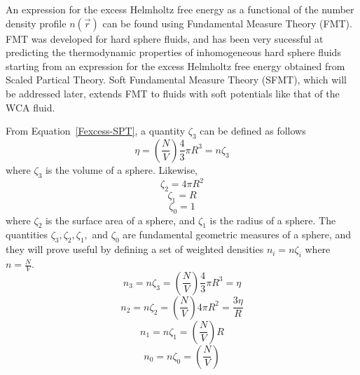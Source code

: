 \documentclass[12pt]{article}
\begin{document}
An expression for the excess Helmholtz free energy as a functional of the number density profile $n(\vec r)$ can be found using Fundamental Measure Theory (FMT).
FMT was developed for hard sphere fluids, and has been very sucessful at predicting the thermodynamic properties of inhomogeneous hard sphere fluids starting from an expression for the excess Helmholtz free energy obtained from Scaled Partical Theory. 
Soft Fundamental Measure Theory (SFMT), which will be addressed later, extends FMT to fluids with soft potentials like that of the WCA fluid.

From Equation~\ref{Fexcess-SPT}, a quantity $\zeta_{3}$ can be defined as follows
\begin{equation}{\eta =\left(\frac{N}{V}\right)\frac{4}{3}\pi{R^3}=n\zeta_{3}}\end{equation}
where $\zeta_{3}$ is the volume of a sphere. Likewise,
\begin{equation}{\zeta_{2}=4\pi{R^2}}\end{equation}
\begin{equation}{\zeta_{1}=R}\end{equation}
\begin{equation}{\zeta_{0}=1}\end{equation}
where $\zeta_{2}$ is the surface area of a sphere, and $\zeta_{1}$ is the radius of a sphere. The quantities $\zeta_{3}, \zeta_{2}, \zeta_{1},$ and $\zeta_{0}$ are fundamental geometric measures of a sphere, and they will prove useful by defining a set of weighted densities $n_{i}=n\zeta_{i}$ where $n=\frac{N}{V}$. 
\begin{equation}\label{n3}{n_{3}=n\zeta_{3}=\left(\frac{N}{V}\right)\frac{4}{3}\pi{R^3}=\eta}\end{equation}
\begin{equation}\label{n2}{n_{2}=n\zeta_{2}=\left(\frac{N}{V}\right)4\pi{R^2}=\frac{3\eta}{R}}\end{equation}
\begin{equation}\label{n1}{n_{1}=n\zeta_{1}=\left(\frac{N}{V}\right)R}\end{equation}
\begin{equation}\label{n0}{n_{0}=n\zeta_{0}=\left(\frac{N}{V}\right)}\end{equation}
\end{document}
